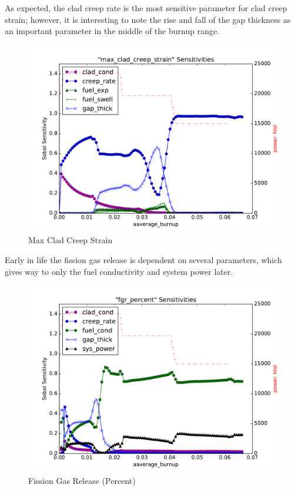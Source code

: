 \documentclass{anstrans} \usepackage{amsmath} \usepackage{amssymb}
\begin{document}
As expected, the clad creep rate is the most sensitive parameter for clad creep strain; however, it is
interesting to note the rise and fall of the gap thickness as an important parameter in the middle of the
burnup range.
\begin{figure}[H]
  \centering
  \includegraphics[width=\linewidth]{./sens_max_clad_creep_strain}
  \caption{Max Clad Creep Strain}
  \label{fig:strain}
\end{figure}
Early in life the fission gas release is dependent on several parameters, which gives way to only the fuel
conductivity and system power later.
\begin{figure}[H]
  \centering
  \includegraphics[width=\linewidth]{./sens_fgr_percent}
  \caption{Fission Gas Release (Percent)}
  \label{fig:fgr}
\end{figure}
\end{document}
